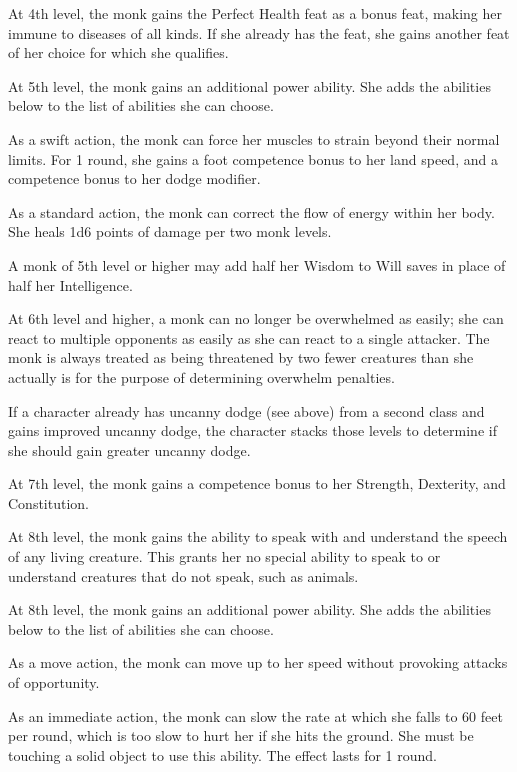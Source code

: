  At 4th level, the monk gains the Perfect Health feat as a bonus feat, making her immune to diseases of all kinds. If she already has the feat, she gains another feat of her choice for which she qualifies.

 At 5th level, the monk gains an additional \ki power ability. She adds the abilities below to the list of abilities she can choose.

 As a swift action, the monk can force her muscles to strain beyond their normal limits. For 1 round, she gains a  foot competence bonus to her land speed, and a  competence bonus to her dodge modifier.

 As a standard action, the monk can correct the flow of energy within her body. She heals 1d6 points of damage per two monk levels.

 A monk of 5th level or higher may add half her Wisdom to Will saves in place of half her Intelligence.

 At 6th level and higher, a monk can no longer be overwhelmed as easily; she can react to multiple opponents as easily as she can react to a single attacker. The monk is always treated as being threatened by two fewer creatures than she actually is for the purpose of determining overwhelm penalties.
\par If a character already has uncanny dodge (see above) from a second class and gains improved uncanny dodge, the character stacks those levels to determine if she should gain greater uncanny dodge.

 At 7th level, the monk gains a  competence bonus to her Strength, Dexterity, and Constitution.

 At 8th level, the monk gains the ability to speak with and understand the speech of any living creature. This grants her no special ability to speak to or understand creatures that do not speak, such as animals.

 At 8th level, the monk gains an additional \ki power ability. She adds the abilities below to the list of abilities she can choose.

 As a move action, the monk can move up to her speed without provoking attacks of opportunity.

 As an immediate action, the monk can slow the rate at which she falls to 60 feet per round, which is too slow to hurt her if she hits the ground. She must be touching a solid object to use this ability. The effect lasts for 1 round.

